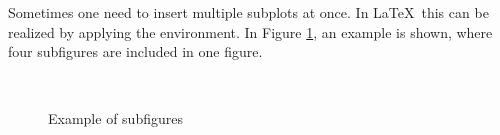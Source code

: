 	Sometimes one need to insert multiple subplots at once. In \LaTeX~this can be realized by applying the {\color{blue}{\verb|\subfloat|}} environment. In Figure \ref{subfloats}, an example is shown, where four subfigures are included in one figure.
	
	\begin{figure}[h!]
		\centering
		 \hspace{1cm}
		 \\
		\caption{Example of subfigures}\label{subfloats}
	\end{figure}

